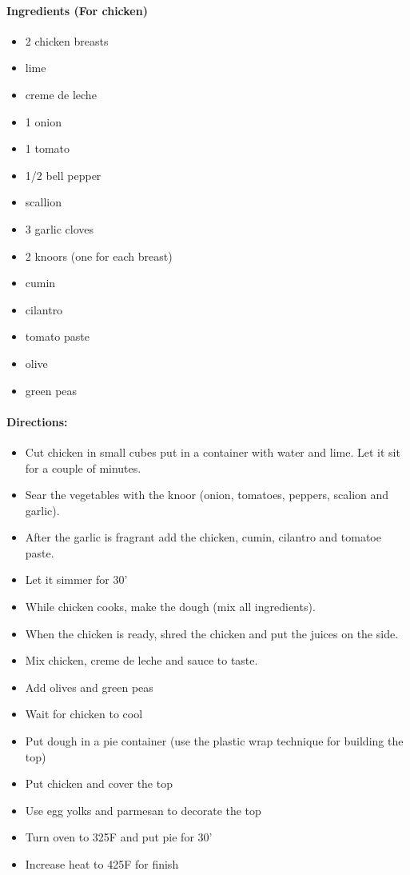 \documentclass{article}
\begin{document}
\paragraph{Ingredients (For chicken)}

\begin{itemize}
	\item 2 chicken breasts
	\item lime
	\item creme de leche
	\item 1 onion
	\item 1 tomato
	\item 1/2 bell pepper
	\item scallion
	\item 3 garlic cloves
	\item 2 knoors (one for each breast)
	\item cumin
	\item cilantro
	\item tomato paste
	\item olive
	\item green peas
\end{itemize}

\paragraph{Directions:}
\begin{itemize}
	\item Cut chicken in small cubes put in a container with water and lime. Let it sit for a couple of minutes.
	\item Sear the vegetables with the knoor (onion, tomatoes, peppers, scalion and garlic).
	\item After the garlic is fragrant add the chicken, cumin, cilantro and tomatoe paste. 
	\item Let it simmer for 30'
	\item While chicken cooks, make the dough (mix all ingredients).
	\item When the chicken is ready, shred the chicken and put the juices on the side.
	\item Mix chicken, creme de leche and sauce to taste. 
	\item Add olives and green peas
	\item Wait for chicken to cool
	\item Put dough in a pie container (use the plastic wrap technique for building the top)
	\item Put chicken and cover the top
	\item Use egg yolks and parmesan to decorate the top
	\item Turn oven to 325F and put pie for 30'
	\item Increase heat to 425F for finish
\end{itemize}
\end{document}
